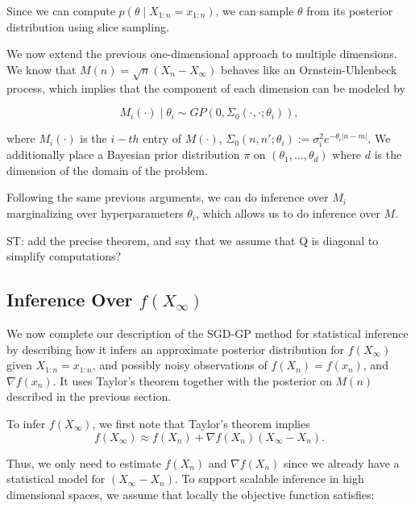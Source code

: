 \documentclass[12pt,english]{article}
\newcommand{\stcomment}[1]{{\color{blue} ST: #1}}
\newcommand{\stedit}[1]{{\color{blue} #1}}
\begin{document}
Since we can compute $p\left(\theta\mid X_{1:n} = x_{1:n}\right)$, we can sample $\theta$ from its posterior distribution using slice sampling. 


\stedit{We now extend the previous one-dimensional approach to multiple dimensions. We know that $M(n)=\sqrt{n}\left(X_{n}-X_{\infty}\right)$ behaves like an Ornstein-Uhlenbeck process, which implies that the component of each dimension can be modeled by

\[
M_{i}(\cdot) \mid \theta_{i}\sim GP\left(0,\Sigma_{0}\left(\cdot,\cdot; \theta_{i}\right)\right),
\]

where $M_{i}(\cdot)$ is the $i-th$ entry of $M(\cdot)$, $\Sigma_{0}(n,n';\theta_{i}):=\sigma_{i}^{2}e^{-\theta_{i}\left|n-m\right|}$. We additionally place a Bayesian prior distribution $\pi$ on $(\theta_{1},\ldots,\theta_{d})$ where $d$ is the dimension of the domain of the problem.

Following the same previous arguments, we can do inference over $M_{i}$  marginalizing over hyperparameters $\theta_{i}$, which allows us to do inference over $M$.} \stcomment{add the precise theorem, and say that we assume that Q is diagonal to simplify computations?}

\subsection{Inference Over $f(X_\infty)$}
\label{sec:SGD-GP-2}
We now complete our description of the SGD-GP method for statistical inference by describing how 
it infers an approximate posterior distribution for $f\left(X_{\infty}\right)$ given $X_{1:n} = x_{1:n}$, \stedit{and possibly noisy observations of $f(X_n)=f(x_n)$, and $\nabla f\left(x_{n}\right)$}. It uses \stedit{Taylor's theorem} together with the posterior on $M(n)$ described in the previous section. 




To infer $f(X_\infty)$, we first note that 
Taylor's theorem implies
\begin{equation}
\label{eq:a}
f\left(X_{\infty}\right) \approx f\left(X_{n}\right)+\nabla f\left(X_{n}\right)\left(X_{\infty}-X_{n}\right).
\end{equation}

Thus, we only need to estimate $f\left(X_{n}\right)$ and $\nabla f\left(X_{n}\right)$ since we already have a statistical model for $\left(X_{\infty}-X_{n}\right)$. To support scalable inference in high dimensional spaces, we assume that locally the objective function satisfies:
\end{document}
